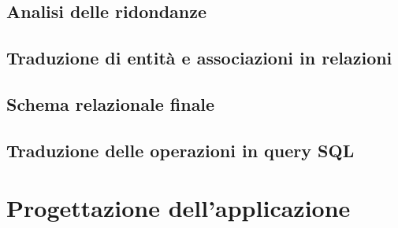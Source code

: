 \documentclass[a4paper,12pt]{report}
\begin{document}
	
	
	\section{Analisi delle ridondanze}
	\section{Traduzione di entità e associazioni in relazioni}
	\section{Schema relazionale finale}
	\section{Traduzione delle operazioni in query SQL}
	\chapter{Progettazione dell'applicazione}
\end{document}
